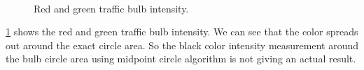 \begin{figure}[ht]
\centering
{}
\hfill
{}\\

\caption{Red and green traffic bulb intensity.}
\label{f:bulb_int}
\end{figure}

\ref{f:bulb_int} shows the red and green traffic bulb intensity.
We can see that the color spreads out around the exact circle area.
So the black color intensity measurement around the bulb circle area using midpoint circle algorithm is not giving an actual result.

